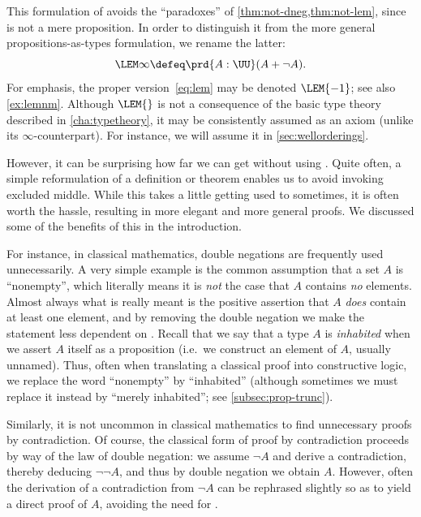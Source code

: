 This formulation of \LEM{} avoids the ``paradoxes'' of \cref{thm:not-dneg,thm:not-lem}, since \bool is not a mere proposition.
In order to distinguish it from the more general propositions-as-types formulation, we rename the latter:
\begin{equation*}
  \LEM\infty \defeq \prd{A:\UU} (A + \neg A).
\end{equation*}
For emphasis, the proper version~\eqref{eq:lem}
may be denoted $\LEM{-1}$;
see also \cref{ex:lemnm}.
Although $\LEM{}$
is not a consequence of the basic type theory described in \cref{cha:typetheory}, it may be consistently assumed as an axiom (unlike its $\infty$-counterpart).
For instance, we will assume it in \cref{sec:wellorderings}.

However, it can be surprising how far we can get without using \LEM{}.
Quite often, a simple reformulation of a definition or theorem enables us to avoid invoking excluded middle.
While this takes a little getting used to sometimes, it is often worth the hassle, resulting in more elegant and more general proofs.
We discussed some of the benefits of this in the introduction.

For instance, in classical mathematics, double negations are frequently used unnecessarily.
A very simple example is the common assumption that a set $A$ is ``nonempty'', which literally means it is \emph{not} the case that $A$ contains \emph{no} elements.
Almost always what is really meant is the positive assertion that $A$ \emph{does} contain at least one element, and by removing the double negation we make the statement less dependent on \LEM{}.
Recall that we say that a type $A$ is \emph{inhabited}
%
when we assert $A$ itself as a proposition (i.e.\ we construct an element of $A$, usually unnamed).
Thus, often when translating a classical proof into constructive logic, we replace the word ``nonempty'' by ``inhabited'' (although sometimes we must replace it instead by ``merely inhabited''; see \cref{subsec:prop-trunc}).

Similarly, it is not uncommon in classical mathematics to find unnecessary proofs by contradiction.
%
Of course, the classical form of proof by contradiction proceeds by way of the law of double negation: we assume $\neg A$ and derive a contradiction, thereby deducing $\neg \neg A$, and thus by double negation we obtain $A$.
However, often the derivation of a contradiction from $\neg A$ can be rephrased slightly so as to yield a direct proof of $A$, avoiding the need for \LEM{}.

